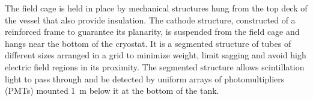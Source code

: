 The field cage is held in place by mechanical structures hung from the
top deck of the vessel that also provide insulation.  The cathode
structure, constructed of a reinforced frame to 
guarantee its planarity, is suspended from the field cage and hangs near the 
bottom of the cryostat. It is a segmented structure of tubes of different sizes 
arranged in a grid to minimize weight, limit sagging and avoid high electric field
regions in its proximity.  The segmented structure allows scintillation light to pass
through and be detected by uniform arrays of photomultipliers (PMTs) mounted
1~m below it at the bottom of the tank.
